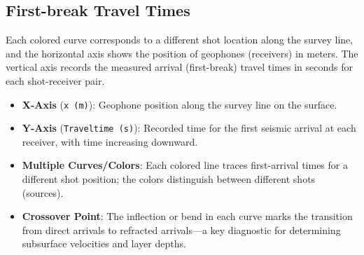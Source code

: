 


\subsection*{First-break Travel Times}
Each colored curve corresponds to a different shot location along the survey line, and the horizontal axis shows the position of geophones (receivers) in meters. The vertical axis records the measured arrival (first-break) travel times in seconds for each shot-receiver pair.
\begin{itemize}
    \item \textbf{X-Axis} (\texttt{x (m)}): Geophone position along the survey line on the surface.
    \item \textbf{Y-Axis} (\texttt{Traveltime (s)}): Recorded time for the first seismic arrival at each receiver, with time increasing downward.
    \item \textbf{Multiple Curves/Colors}: Each colored line traces first-arrival times for a different shot position; the colors distinguish between different shots (sources).
    \item \textbf{Crossover Point}: The inflection or bend in each curve marks the transition from direct arrivals to refracted arrivals—a key diagnostic for determining subsurface velocities and layer depths.
\end{itemize}

